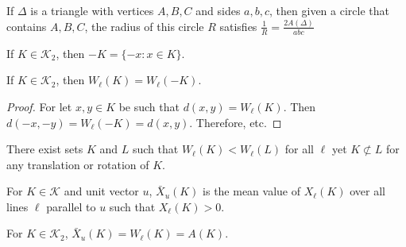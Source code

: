 \documentclass[crop=false,class=book]{standalone}
\begin{document}
\begin{theorem}
If $\Delta$ is a triangle with vertices $A,B,C$ and sides $a,b,c$, then given a circle that contains $A,B,C$, the radius of this circle $R$ satisfies $\frac{1}{R} =\frac{2A(\Delta)}{abc}$
\end{theorem}
\begin{definition}
If $K\in \mathscr{K}_2$, then $-K = \{-x:x\in K\}$.
\end{definition}
\begin{theorem}
If $K\in \mathscr{K}_2$, then $W_{\ell}(K) = W_{\ell}(-K)$.
\end{theorem}
\begin{proof}
For let $x,y\in K$ be such that $d(x,y) = W_{\ell}(K)$. Then $d(-x,-y) = W_{\ell}(-K) = d(x,y)$. Therefore, etc.
\end{proof}
\begin{theorem}
There exist sets $K$ and $L$ such that $W_{\ell}(K)<W_{\ell}(L)$ for all $\ell$ yet $K\not\subset L$ for any translation or rotation of $K$.
\end{theorem}
\begin{definition}
For $K\in \mathscr{K}$ and unit vector $u$, $\bar{X}_{u}(K)$ is the mean value of $X_{\ell}(K)$ over all lines $\ell$ parallel to $u$ such that $X_{\ell}(K)>0$.
\end{definition}
\begin{theorem}
For $K\in \mathscr{K}_2$, $\bar{X}_{u}(K) = W_{\ell}(K)=A(K)$.
\end{theorem}
\end{document}
